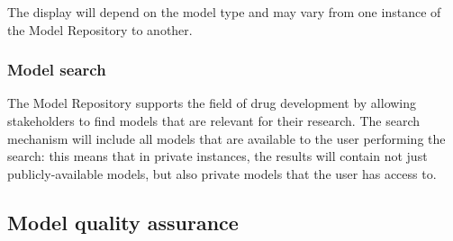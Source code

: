 The display will depend on the model type and may vary from one instance of the Model Repository to another.

\subsubsection{Model search}
The \ddmore Model Repository supports the field of drug development by allowing stakeholders to find models that are relevant for their research. The search mechanism will include all models that are available to the user performing the search: this means that in private instances, the results will contain not just publicly-available models, but also private models that the user has access to.





\subsection{Model quality assurance}

